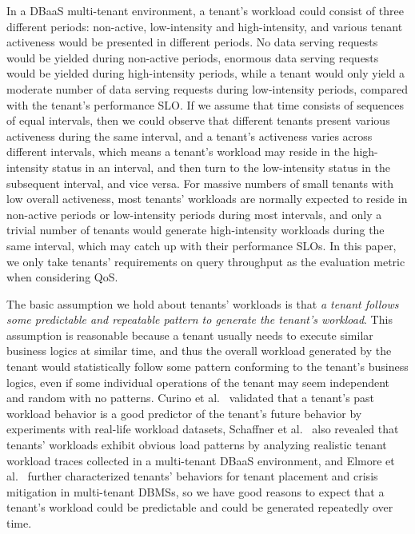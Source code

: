 In a DBaaS multi-tenant environment, a tenant's workload could consist of three different periods: non-active, low-intensity and high-intensity, and various tenant activeness would be presented in different periods. No data serving requests would be yielded during non-active periods, enormous data serving requests would be yielded during high-intensity periods, while a tenant would only yield a moderate number of data serving requests during low-intensity periods, compared with the tenant's performance SLO. If we assume that time consists of sequences of equal intervals, then we could observe that different tenants present various activeness during the same interval, and a tenant's activeness varies across different intervals, which means a tenant's workload may reside in the high-intensity status in an interval, and then turn to the low-intensity status in the subsequent interval, and vice versa. For massive numbers of small tenants with low overall activeness, most tenants' workloads are normally expected to reside in non-active periods or low-intensity periods during most intervals, and only a trivial number of tenants would generate high-intensity workloads during the same interval, which may catch up with their performance SLOs. In this paper, we only take tenants' requirements on query throughput as the evaluation metric when considering QoS.

The basic assumption we hold about tenants' workloads is that \emph{a tenant follows some predictable and repeatable pattern to generate the tenant's workload}. This assumption is reasonable because a tenant usually needs to execute similar business logics at similar time, and thus the overall workload generated by the tenant would statistically follow some pattern conforming to the tenant's business logics, even if some individual operations of the tenant may seem independent and random with no patterns. Curino et al.~\cite{Workload-Aware} validated that a tenant's past workload behavior is a good predictor of the tenant's future behavior by experiments with real-life workload datasets, Schaffner et al.~\cite{Real-Trace} also revealed that tenants' workloads exhibit obvious load patterns by analyzing realistic tenant workload traces collected in a multi-tenant DBaaS environment, and Elmore et al.~\cite{CTBP} further characterized tenants' behaviors for tenant placement and crisis mitigation in multi-tenant DBMSs, so we have good reasons to expect that a tenant's workload could be predictable and could be generated repeatedly over time.

